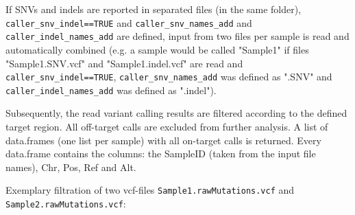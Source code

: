 \documentclass{article}
\begin{document}
If SNVs and indels are reported in separated files (in the same folder), \texttt{caller\_snv\_indel==TRUE} and \texttt{caller\_snv\_names\_add} and \texttt{caller\_indel\_names\_add} are defined, input from two files per sample is read and automatically combined (e.g. a sample would be called "Sample1" if files "Sample1.SNV.vcf" and "Sample1.indel.vcf" are read and \texttt{caller\_snv\_indel==TRUE}, \texttt{caller\_snv\_names\_add} was defined as ".SNV" and \texttt{caller\_indel\_names\_add} was defined as ".indel").

Subsequently, the read variant calling results are filtered according to the defined target region. All off-target calls are excluded from further analysis. A list of data.frames (one list per sample) with all on-target calls is returned. Every data.frame contains the columns: the SampleID (taken from the input file names), Chr, Pos, Ref and Alt.

Exemplary filtration of two vcf-files \texttt{Sample1.rawMutations.vcf} and \texttt{Sample2.rawMutations.vcf}:
\end{document}
